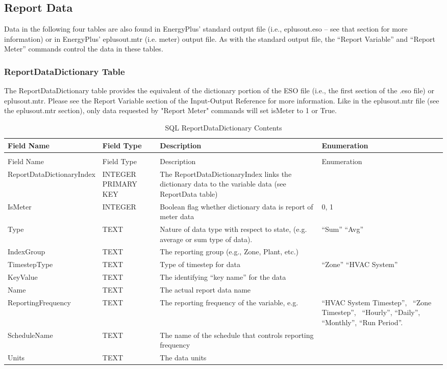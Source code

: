 \subsection{Report Data}

Data in the following four tables are also found in EnergyPlus’ standard output file (i.e., eplusout.eso – see that section for more information) or in EnergyPlus' eplusout.mtr (i.e. meter) output file. As with the standard output file, the “Report Variable” and “Report Meter” commands control the data in these tables.

\subsubsection{ReportDataDictionary Table}

The ReportDataDictionary table provides the equivalent of the dictionary portion of the ESO file (i.e., the first section of the .eso file) or eplusout.mtr. Please see the Report Variable section of the Input-Output Reference for more information.  Like in the eplusout.mtr file (see the eplusout.mtr section), only data requested by "Report Meter" commands will set isMeter to 1 or True.

{\scriptsize
\begin{longtable}[c]{>{\raggedright}p{1.5in}>{\raggedright}p{1.5in}>{\raggedright}p{1.5in}>{\raggedright}p{1.5in}}
\caption{SQL ReportDataDictionary Contents \label{table:table-7.-sql-reportdatadictionary-contents}} \tabularnewline
\toprule 
Field Name & Field Type & Description & Enumeration \tabularnewline
\midrule
\endfirsthead

\caption[]{SQL ReportDataDictionary Contents} \tabularnewline
\toprule 
Field Name & Field Type & Description & Enumeration \tabularnewline
\midrule
\endhead

Report\-Data\-Dictionary\-Index & INTEGER PRIMARY KEY & The ReportDataDictionaryIndex links the dictionary data to the variable data (see ReportData table) & ~ \tabularnewline
IsMeter & INTEGER & Boolean flag whether dictionary data is report of meter data & 0, 1 \tabularnewline
Type & TEXT & Nature of data type with respect to state, (e.g. average or sum type of data). & “Sum” “Avg” \tabularnewline
IndexGroup & TEXT & The reporting group (e.g., Zone, Plant, etc.) & ~ \tabularnewline
TimestepType & TEXT & Type of timestep for data & “Zone”
    “HVAC System” \tabularnewline
KeyValue & TEXT & The identifying “key name” for the data & ~ \tabularnewline
Name & TEXT & The actual report data name & ~ \tabularnewline
ReportingFrequency & TEXT & The reporting frequency of the variable, e.g. & “HVAC System Timestep”,~ “Zone Timestep”,~ “Hourly”, “Daily”, “Monthly”, “Run Period”. \tabularnewline
ScheduleName & TEXT & The name of the schedule that controls reporting frequency & ~ \tabularnewline
Units & TEXT & The data units & ~ \tabularnewline
\bottomrule
\end{longtable}}

